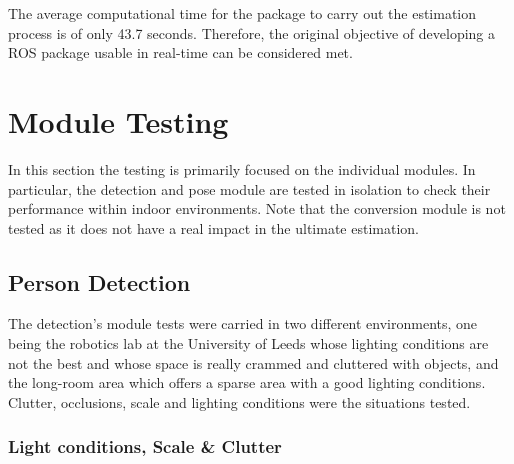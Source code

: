 The average computational time for the package to carry out the estimation process is of only 43.7 seconds. Therefore, the original objective of developing a ROS package usable in real-time can be considered met.

\section{Module Testing}

In this section the testing is primarily focused on the individual modules. In particular, the detection and pose module are tested in isolation to check their performance within indoor environments. Note that the conversion module is not tested as it does not have a real impact in the ultimate estimation.

\subsection{Person Detection}

The detection's module tests were carried in two different environments, one being the robotics lab at the University of Leeds whose lighting conditions are not the best and whose space is really crammed and cluttered with objects, and the long-room area which offers a sparse area with a good lighting conditions. Clutter, occlusions, scale and lighting conditions were the situations tested.

\subsubsection{Light conditions, Scale \& Clutter}

